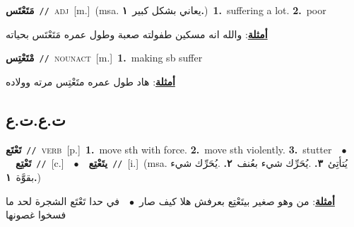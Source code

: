 \documentclass[10pt,a4paper,twoside]{article} %
\begin{document}
\begin{multicols}{2}
{\setlength\topsep{0pt}\textbf{\foreignlanguage{arabic}{مَتَعْتَس}}\ {\color{gray}\texttt{//}\color{black}}\ \textsc{adj}\ [m.]\ \color{gray}(msa. \foreignlanguage{arabic}{يعاني بشكل كبير}~\foreignlanguage{arabic}{\textbf{١.}})\color{black}\ \textbf{1.}~suffering a lot.  \textbf{2.}~poor\  \begin{flushright}\color{gray}\foreignlanguage{arabic}{\textbf{\underline{\foreignlanguage{arabic}{أمثلة}}}: والله انه مسكين طفولته صعبة وطول عمره مَتَعْتَس بحياته}\end{flushright}\color{black}} \vspace{2mm}

{\setlength\topsep{0pt}\textbf{\foreignlanguage{arabic}{مْتَعْتِس}}\ {\color{gray}\texttt{//}\color{black}}\ \textsc{noun\textunderscore act}\ [m.]\ \textbf{1.}~making sb suffer\  \begin{flushright}\color{gray}\foreignlanguage{arabic}{\textbf{\underline{\foreignlanguage{arabic}{أمثلة}}}: هاد طول عمره متَعْتِس مرته وولاده}\end{flushright}\color{black}} \vspace{2mm}

\vspace{-3mm}
\subsection*{\color{blue}\foreignlanguage{arabic}{ت.ع.ت.ع}\color{blue}{}} 

{\setlength\topsep{0pt}\textbf{\foreignlanguage{arabic}{تَعْتَع}}\ {\color{gray}\texttt{//}\color{black}}\ \textsc{verb}\ [p.]\ \textbf{1.}~move sth with force.  \textbf{2.}~move sth violently.  \textbf{3.}~stutter\ \ $\bullet$\ \ \setlength\topsep{0pt}\textbf{\foreignlanguage{arabic}{تَعْتِع}}\ {\color{gray}\texttt{//}\color{black}}\ [c.]\ \ $\bullet$\ \ \setlength\topsep{0pt}\textbf{\foreignlanguage{arabic}{يتَعْتِع}}\ {\color{gray}\texttt{//}\color{black}}\ [i.]\ \color{gray}(msa. \foreignlanguage{arabic}{يُتأتِئ}~\foreignlanguage{arabic}{\textbf{٣.}}  .\foreignlanguage{arabic}{يُحَرِّك شيء بعُنف}~\foreignlanguage{arabic}{\textbf{٢.}}  .\foreignlanguage{arabic}{يُحَرِّك شيء بقوَّة}~\foreignlanguage{arabic}{\textbf{١.}})\color{black}\  \begin{flushright}\color{gray}\foreignlanguage{arabic}{\textbf{\underline{\foreignlanguage{arabic}{أمثلة}}}: من وهو صغير بيتَعْتِع بعرفش هلا كيف صار\ $\bullet$\ \  في حدا تَعْتَع الشجرة لحد ما فسخوا غصونها}\end{flushright}\color{black}} \vspace{2mm}


\end{multicols}
\end{document}
